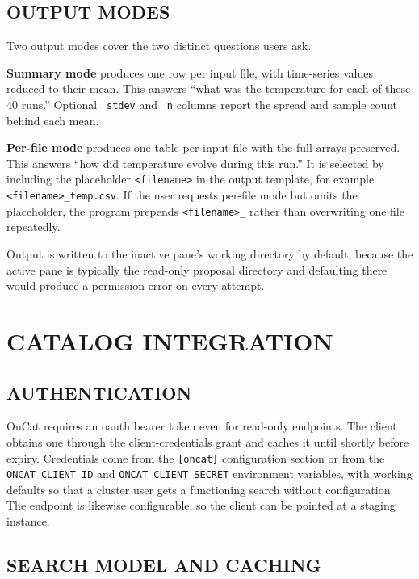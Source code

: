 \documentclass[tm]{ornltm}
\begin{document}
\subsection{OUTPUT MODES}

Two output modes cover the two distinct questions users ask.

\textbf{Summary mode} produces one row per input file, with time-series values
reduced to their mean. This answers ``what was the temperature for each of these
40 runs.'' Optional \texttt{\_stdev} and \texttt{\_n} columns report the spread
and sample count behind each mean.

\textbf{Per-file mode} produces one table per input file with the full arrays
preserved. This answers ``how did temperature evolve during this run.'' It is
selected by including the placeholder \texttt{<filename>} in the output template,
for example \texttt{<filename>\_temp.csv}. If the user requests per-file mode but
omits the placeholder, the program prepends \texttt{<filename>\_} rather than
overwriting one file repeatedly.

Output is written to the inactive pane's working directory by default, because
the active pane is typically the read-only proposal directory and defaulting
there would produce a permission error on every attempt.

\section{CATALOG INTEGRATION}
\label{sec:oncat}

\subsection{AUTHENTICATION}

OnCat requires an \ac{oauth} bearer token even for read-only endpoints. The
client obtains one through the client-credentials grant and caches it until
shortly before expiry. Credentials come from the \texttt{[oncat]} configuration
section or from the \texttt{ONCAT\_CLIENT\_ID} and \texttt{ONCAT\_CLIENT\_SECRET}
environment variables, with working defaults so that a cluster user gets a
functioning search without configuration. The endpoint is likewise configurable,
so the client can be pointed at a staging instance.

\subsection{SEARCH MODEL AND CACHING}
\end{document}
